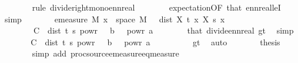 \begin{isabellebody}
\ \ \ \ \ \ \isamarkupfalse%
\ {\isacharparenleft}{\kern0pt}rule\ divide{\isacharunderscore}{\kern0pt}right{\isacharunderscore}{\kern0pt}mono{\isacharunderscore}{\kern0pt}ennreal{\isacharparenright}{\kern0pt}\isanewline
\ \ \ \ \ \ \isamarkupfalse%
\ expectation{\isacharbrackleft}{\kern0pt}OF\ that{\isacharparenleft}{\kern0pt}{}{\isacharcomma}{\kern0pt}{}{\isacharparenright}{\kern0pt}{\isacharbrackright}{\kern0pt}\ ennreal{\isacharunderscore}{\kern0pt}leI\ \isamarkupfalse%
\ simp\isanewline
\ \ \ \ \isamarkupfalse%
\ \isamarkupfalse%
\ {\isachardoublequoteopen}emeasure\ {\isacharquery}{\kern0pt}M\ {\isacharbraceleft}{\kern0pt}x\ {\isasymin}\ space\ {\isacharquery}{\kern0pt}M{\isachardot}{\kern0pt}\ {\isasymepsilon}\ {\isasymle}\ dist\ {\isacharparenleft}{\kern0pt}X\ t\ x{\isacharparenright}{\kern0pt}\ {\isacharparenleft}{\kern0pt}X\ s\ x{\isacharparenright}{\kern0pt}{\isacharbraceright}{\kern0pt}\isanewline
\ \ \ \ \ \ \ {\isasymle}\ {\isacharparenleft}{\kern0pt}C\ {\isacharasterisk}{\kern0pt}\ dist\ t\ s\ powr\ {\isacharparenleft}{\kern0pt}{}\ {\isacharplus}{\kern0pt}\ b{\isacharparenright}{\kern0pt}{\isacharparenright}{\kern0pt}\ {\isacharslash}{\kern0pt}\ {\isasymepsilon}\ powr\ a{\isachardoublequoteclose}\isanewline
\ \ \ \ \ \ \isamarkupfalse%
\ that{\isacharparenleft}{\kern0pt}{}{\isacharparenright}{\kern0pt}\ divide{\isacharunderscore}{\kern0pt}ennreal\ gt{\isacharunderscore}{\kern0pt}{}{\isacharparenleft}{\kern0pt}{}{\isacharparenright}{\kern0pt}\ \isamarkupfalse%
\ simp\isanewline
\ \ \ \ \isamarkupfalse%
\ \isamarkupfalse%
\ {\isachardoublequoteopen}C\ {\isacharasterisk}{\kern0pt}\ dist\ t\ s\ powr\ {\isacharparenleft}{\kern0pt}{}\ {\isacharplus}{\kern0pt}\ b{\isacharparenright}{\kern0pt}\ {\isacharslash}{\kern0pt}\ {\isasymepsilon}\ powr\ a\ {\isasymge}\ {}{\isachardoublequoteclose}\isanewline
\ \ \ \ \ \ \isamarkupfalse%
\ gt{\isacharunderscore}{\kern0pt}{}{\isacharparenleft}{\kern0pt}{}{\isacharparenright}{\kern0pt}\ \isamarkupfalse%
\ auto\isanewline
\ \ \ \ \isamarkupfalse%
\ \isamarkupfalse%
\ {\isacharquery}{\kern0pt}thesis\isanewline
\ \ \ \ \ \ \isamarkupfalse%
\ {\isacharparenleft}{\kern0pt}simp\ add{\isacharcolon}{\kern0pt}\ proc{\isacharunderscore}{\kern0pt}source{\isachardot}{\kern0pt}emeasure{\isacharunderscore}{\kern0pt}eq{\isacharunderscore}{\kern0pt}measure{\isacharparenright}{\kern0pt}\isanewline

\end{isabellebody}
